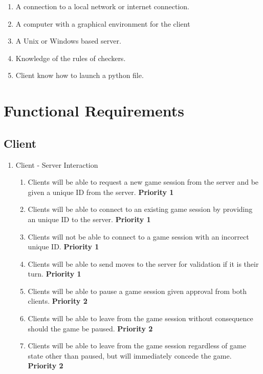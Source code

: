\documentclass[10pt]{article}
\begin{document}
\begin{enumerate}
    \item A connection to a local network or internet connection.
    \item A computer with a graphical environment for the client
    \item A Unix or Windows based server.
    \item Knowledge of the rules of checkers.
    \item Client know how to launch a python file.
\end{enumerate}

\section{Functional Requirements}

\subsection{Client}

\begin{enumerate}[label*=R\arabic*.]
    \item Client - Server Interaction
    \begin{enumerate}[label*=\arabic*.]
        \item Clients will be able to request a new game session from the server and be given a unique ID from the server. \textbf{Priority 1}
        \item Clients will be able to connect to an existing game session by providing an unique ID to the server. \textbf{Priority 1}
        \item Clients will not be able to connect to a game session with an incorrect unique ID. \textbf{Priority 1}
        \item Clients will be able to send moves to the server for validation if it is their turn. \textbf{Priority 1}
        \item Clients will be able to pause a game session given approval from both clients. \textbf{Priority 2}
        \item Clients will be able to leave from the game session without consequence should the game be paused. \textbf{Priority 2}
        \item Clients will be able to leave from the game session regardless of game state other than paused, but will immediately concede the game. \textbf{Priority 2}
    \end{enumerate}
\end{enumerate}
\end{document}
